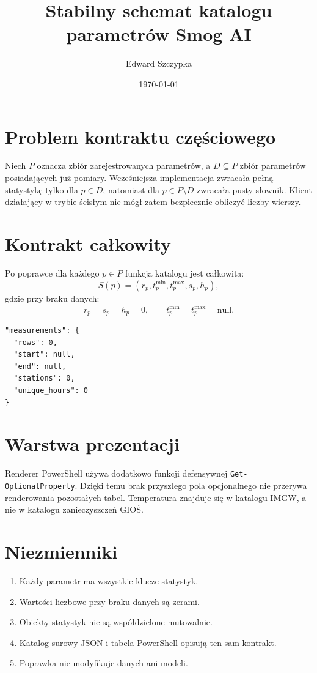 \documentclass[11pt,a4paper]{article}
\title{Stabilny schemat katalogu parametrów Smog AI}
\author{Edward Szczypka}
\date{\today}
\begin{document}
\maketitle
\section{Problem kontraktu częściowego}
Niech $P$ oznacza zbiór zarejestrowanych parametrów, a $D\subseteq P$ zbiór
parametrów posiadających już pomiary. Wcześniejsza implementacja zwracała
pełną statystykę tylko dla $p\in D$, natomiast dla $p\in P\setminus D$
zwracała pusty słownik. Klient działający w trybie ścisłym nie mógł zatem
bezpiecznie obliczyć liczby wierszy.

\section{Kontrakt całkowity}
Po poprawce dla każdego $p\in P$ funkcja katalogu jest całkowita:
\[
 S(p)=(r_p,t_p^{\min},t_p^{\max},s_p,h_p),
\]
gdzie przy braku danych:
\[
 r_p=s_p=h_p=0,\qquad
 t_p^{\min}=t_p^{\max}=\mathrm{null}.
\]

\begin{lstlisting}
"measurements": {
  "rows": 0,
  "start": null,
  "end": null,
  "stations": 0,
  "unique_hours": 0
}
\end{lstlisting}

\section{Warstwa prezentacji}
Renderer PowerShell używa dodatkowo funkcji defensywnej
\texttt{Get-OptionalProperty}. Dzięki temu brak przyszłego pola opcjonalnego
nie przerywa renderowania pozostałych tabel. Temperatura znajduje się w
katalogu IMGW, a nie w katalogu zanieczyszczeń GIOŚ.

\section{Niezmienniki}
\begin{enumerate}
\item Każdy parametr ma wszystkie klucze statystyk.
\item Wartości liczbowe przy braku danych są zerami.
\item Obiekty statystyk nie są współdzielone mutowalnie.
\item Katalog surowy JSON i tabela PowerShell opisują ten sam kontrakt.
\item Poprawka nie modyfikuje danych ani modeli.
\end{enumerate}
\end{document}
